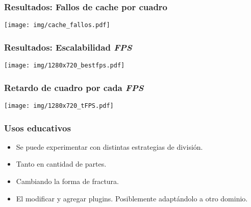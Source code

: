 \documentclass[11pt,a4paper,spanish]{beamer}
\begin{document}
\begin{frame}

\frametitle{Resultados: Fallos de cache por cuadro}

\texttt{[image: img/cache\_fallos.pdf]}

\end{frame}

\begin{frame}

\frametitle{Resultados: Escalabilidad \emph{FPS}}

\texttt{[image: img/1280x720\_bestfps.pdf]}

\end{frame}

\begin{frame}

\frametitle{Retardo de cuadro por cada \emph{FPS}}

\texttt{[image: img/1280x720\_tFPS.pdf]}

\end{frame}

\begin{frame}

\frametitle{Usos educativos}


\begin{itemize}

	\item Se puede experimentar con distintas estrategias de división.

	\item Tanto en cantidad de partes.

	\item Cambiando la forma de fractura.

	\item El modificar y agregar plugins. Posiblemente adaptándolo a otro
		dominio.

\end{itemize}

\end{frame}
\end{document}
